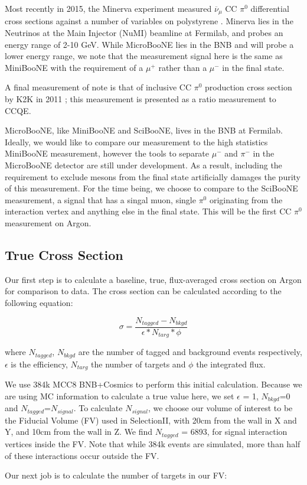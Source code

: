 \documentclass[12pt]{article}
\begin{document}
\par Most recently in 2015, the Minerva experiment measured $\overline{\nu}_\mu$ CC $\pi^0$ differential cross sections against a number of variables  on polystyrene \cite{bib:minerva_thesis} \cite{bib:minerva_paper}.  Minerva lies in the Neutrinos at the Main Injector (NuMI) beamline at Fermilab, and probes an energy range of 2-10 GeV.  While MicroBooNE lies in the BNB and will probe a lower energy range, we note that the measurement signal here is the same as MiniBooNE with the requirement of a $\mu^+$ rather than a $\mu^-$ in the final state. 
\par A final measurement of note is that of inclusive CC $\pi^0$ production cross section by K2K in 2011 \cite{bib:k2k_paper}; this measurement is presented as a ratio measurement to CCQE.  
\par MicroBooNE, like MiniBooNE and SciBooNE, lives in the BNB at Fermilab. Ideally, we would like to compare our measurement to the high statistics MiniBooNE measurement, however the tools to separate $\mu^-$ and $\pi^-$ in the MicroBooNE detector are still under development. As a result, including the requirement to exclude mesons from the final state artificially damages the purity of this measurement.  For the time being, we choose to compare to the SciBooNE measurement, a signal that has a singal muon, single $\pi^0$ originating from the interaction vertex and anything else in the final state. This will be the first CC $\pi^0$ measurement on Argon.


\subsection{True Cross Section}
Our first step is to calculate a baseline, true, flux-averaged cross section on Argon for comparison to data. The cross section can be calculated according to the following equation:

\begin{equation}
  \sigma = \frac{N_{tagged} - N_{bkgd}}{\epsilon*N_{targ}*\phi}
\end{equation}

\noindent where $N_{tagged}$, $N_{bkgd}$ are the number of tagged and background events respectively, $\epsilon$ is the efficiency, $N_{targ}$ the number of targets and $\phi$ the integrated flux. 
\par  We use 384k MCC8 BNB+Cosmics to perform this initial calculation.  Because we are using MC information to calculate a true value here, we set $\epsilon$ = 1, $N_{bkgd}$=0 and $N_{tagged}$=$N_{signal}$.  To calculate $N_{signal}$, we choose our volume of interest to be the Fiducial Volume (FV) used in SelectionII, with 20cm from the wall in X and Y, and 10cm from the wall in Z. We find $N_{tagged}$ = 6893, for signal interaction vertices inside the FV. Note that while 384k events are simulated, more than half of these interactions occur outside the FV. 
\par Our next job is to calculate the number of targets in our FV:
\end{document}
